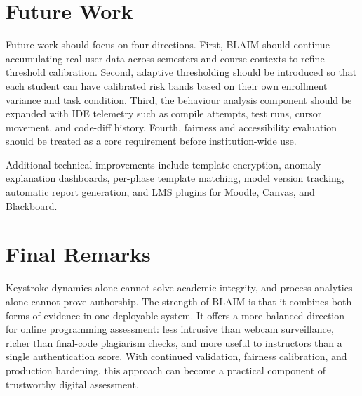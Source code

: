 \section{Future Work}
\label{sec:future-work}

Future work should focus on four directions. First, BLAIM should continue accumulating real-user data across semesters and course contexts to refine threshold calibration. Second, adaptive thresholding should be introduced so that each student can have calibrated risk bands based on their own enrollment variance and task condition. Third, the behaviour analysis component should be expanded with IDE telemetry such as compile attempts, test runs, cursor movement, and code-diff history. Fourth, fairness and accessibility evaluation should be treated as a core requirement before institution-wide use.

Additional technical improvements include template encryption, anomaly explanation dashboards, per-phase template matching, model version tracking, automatic report generation, and LMS plugins for Moodle, Canvas, and Blackboard.

\section{Final Remarks}
\label{sec:final-remarks}

Keystroke dynamics alone cannot solve academic integrity, and process analytics alone cannot prove authorship. The strength of BLAIM is that it combines both forms of evidence in one deployable system. It offers a more balanced direction for online programming assessment: less intrusive than webcam surveillance, richer than final-code plagiarism checks, and more useful to instructors than a single authentication score. With continued validation, fairness calibration, and production hardening, this approach can become a practical component of trustworthy digital assessment.

\clearpage

